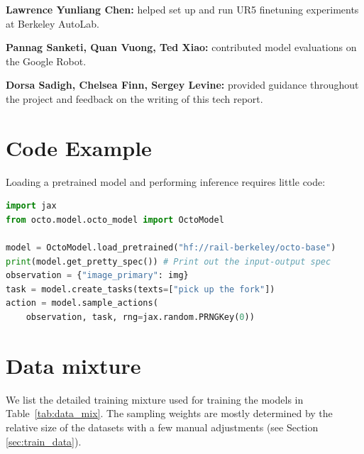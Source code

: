 \begin{appendices}
    \noindent\textbf{Lawrence Yunliang Chen:} helped set up and run UR5 finetuning experiments at Berkeley AutoLab.

    \noindent\textbf{Pannag Sanketi, Quan Vuong, Ted Xiao:} contributed model evaluations on the Google Robot.
    
    \noindent\textbf{Dorsa Sadigh, Chelsea Finn, Sergey Levine:} provided guidance throughout the project and feedback on the writing of this tech report.



\section{\method{} Code Example}
\label{sec:app:code_example}

Loading a pretrained \method{} model and performing inference requires little code:

\begin{lstlisting}[language=Python, caption=Example Python code to perform inference with a pretrained Octo model., basicstyle=\tiny\ttfamily]
import jax
from octo.model.octo_model import OctoModel

model = OctoModel.load_pretrained("hf://rail-berkeley/octo-base")
print(model.get_pretty_spec()) # Print out the input-output spec
observation = {"image_primary": img}   
task = model.create_tasks(texts=["pick up the fork"])
action = model.sample_actions(
    observation, task, rng=jax.random.PRNGKey(0))


\end{lstlisting}

\section{Data mixture}
\label{sec:app:data_mix}

We list the detailed training mixture used for training the \method{} models in Table~\ref{tab:data_mix}. The sampling weights are mostly determined by the relative size of the datasets with a few manual adjustments (see Section \ref{sec:train_data}). 


\end{appendices}
